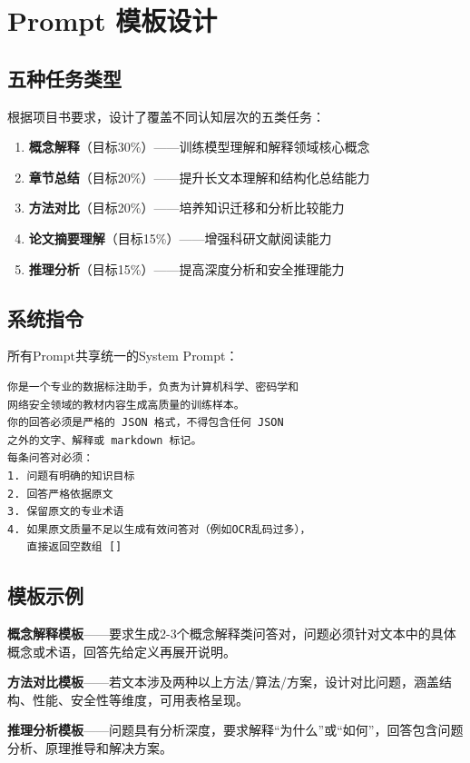 \documentclass[12pt,a4paper]{ctexart}
\begin{document}
\section{Prompt 模板设计}

\subsection{五种任务类型}

根据项目书要求，设计了覆盖不同认知层次的五类任务：

\begin{enumerate}[nosep]
    \item \textbf{概念解释}（目标30\%）——训练模型理解和解释领域核心概念
    \item \textbf{章节总结}（目标20\%）——提升长文本理解和结构化总结能力
    \item \textbf{方法对比}（目标20\%）——培养知识迁移和分析比较能力
    \item \textbf{论文摘要理解}（目标15\%）——增强科研文献阅读能力
    \item \textbf{推理分析}（目标15\%）——提高深度分析和安全推理能力
\end{enumerate}

\subsection{系统指令}

所有Prompt共享统一的System Prompt：

\begin{verbatim}
你是一个专业的数据标注助手，负责为计算机科学、密码学和
网络安全领域的教材内容生成高质量的训练样本。
你的回答必须是严格的 JSON 格式，不得包含任何 JSON
之外的文字、解释或 markdown 标记。
每条问答对必须：
1. 问题有明确的知识目标
2. 回答严格依据原文
3. 保留原文的专业术语
4. 如果原文质量不足以生成有效问答对（例如OCR乱码过多），
   直接返回空数组 []
\end{verbatim}

\subsection{模板示例}

\textbf{概念解释模板}——要求生成2-3个概念解释类问答对，问题必须针对文本中的具体概念或术语，回答先给定义再展开说明。

\textbf{方法对比模板}——若文本涉及两种以上方法/算法/方案，设计对比问题，涵盖结构、性能、安全性等维度，可用表格呈现。

\textbf{推理分析模板}——问题具有分析深度，要求解释“为什么”或“如何”，回答包含问题分析、原理推导和解决方案。
\end{document}
